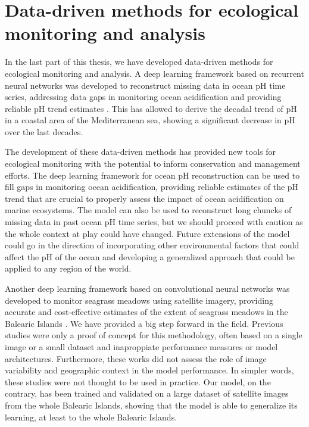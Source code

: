 \section{Data-driven methods for ecological monitoring and analysis}

In the last part of this thesis, we have developed data-driven methods for
ecological monitoring and analysis. A deep learning framework based on
recurrent neural networks was developed to reconstruct missing data in ocean
pH time series, addressing data gaps in monitoring ocean acidification and
providing reliable pH trend estimates \cite{Flecha2022}. This has allowed to
derive the decadal trend of pH in a coastal area of the Mediterranean sea,
showing a significant decrease in pH over the last decades.

The development of these data-driven methods has provided new tools for
ecological monitoring with the potential to inform conservation and management
efforts. The deep learning framework for ocean pH reconstruction can be used to
fill gaps in monitoring ocean acidification, providing reliable estimates of
the pH trend that are crucial to properly assess the impact of ocean
acidification on marine ecosystems. The model can also be used to reconstruct
long chuncks of missing data in past ocean pH time series, but we should
proceed with caution as the whole context at play could have changed. Future
extensions of the model could go in the direction of incorporating other
environmental factors that could affect the pH of the ocean and developing a
generalized approach that could be applied to any region of the world.

Another deep learning framework based on convolutional neural networks was
developed to monitor seagrass meadows using satellite imagery, providing
accurate and cost-effective estimates of the extent of seagrass meadows in the
Balearic Islands \cite{GimenezRomero2024_posi}. We have provided a big step
forward in the field. Previous studies were only a proof of concept for this
methodology, often based on a single image or a small dataset and inaproppiate
performance measures or model architectures. Furthermore, these works did not
assess the role of image variability and geographic context in the model
performance. In simpler words, these studies were not thought to be used in
practice. Our model, on the contrary, has been trained and validated on a large
dataset of satellite images from the whole Balearic Islands, showing that the
model is able to generalize its learning, at least to the whole Balearic
Islands.

